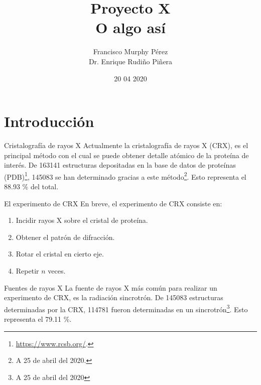 \documentclass{beamer}
\title{Proyecto X \\ O algo así}
\author{Francisco Murphy Pérez \\ Dr. Enrique Rudiño Piñera}
\institute{Instituto de Biotecnología \\ Universidad Nacional Autónoma de México}
\date{20 04 2020}
\begin{document}

\begin{frame}
	\maketitle %
\end{frame}


\section{Introducción}

\begin{frame}{Cristalografía de rayos X}
Actualmente la cristalografía de rayos X (CRX), es el principal método con el cual se puede obtener detalle atómico de la proteína de interés. De 163141 estructuras depositadas en la base de datos de proteínas (PDB)\footnote{\url{https://www.rcsb.org/}.}, 145083 se han determinado gracias a este método\footnote{A 25 de abril del 2020.}. Esto representa el 88.93 \% del total.
\end{frame}

\begin{frame}{El experimento de CRX}
En breve, el experimento de CRX consiste en:

\begin{enumerate}
	\item Incidir \alert{rayos X} sobre el cristal de proteína. 
	\item Obtener el patrón de difracción. 
	\item Rotar el cristal en cierto eje. 
	\item Repetir $n$ veces.
\end{enumerate}

\end{frame}

\begin{frame}{Fuentes de rayos X}
La fuente de rayos X más común para realizar un experimento de CRX, es la radiación sincrotrón. De 145083 estructuras determinadas por la CRX, 114781 fueron determinadas en un sincrotrón\footnote{A 25 de abril del 2020}. Esto representa el 79.11 \%. 
\end{frame}
\end{document}
